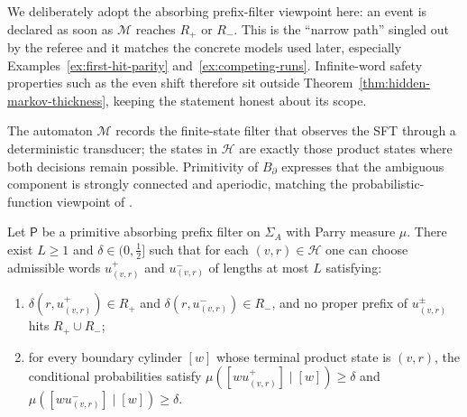 \begin{remark}
We deliberately adopt the absorbing prefix-filter viewpoint here: an event is
declared as soon as $\mathcal{M}$ reaches $R_+$ or $R_-$.  This is the
``narrow path'' singled out by the referee and it matches the concrete models
used later, especially Examples~\ref{ex:first-hit-parity}
and~\ref{ex:competing-runs}.  Infinite-word safety properties such as the even
shift therefore sit outside Theorem~\ref{thm:hidden-markov-thickness}, keeping
the statement honest about its scope.
\end{remark}

The automaton $\mathcal{M}$ records the finite-state filter that observes the
SFT through a deterministic transducer; the states in $\mathcal{H}$ are exactly
those product states where both decisions remain possible.  Primitivity of
$B_\partial$ expresses that the ambiguous component is strongly connected and
aperiodic, matching the probabilistic-function viewpoint of
\cite{Blackwell1957,Heller1965,BaumPetrie1966,BoylePetersenHMP,Verbitskiy2011}.

\begin{lemma}
\label{lem:uniform-windows}
Let $\mathsf{P}$ be a primitive absorbing prefix filter on $\Sigma_A$ with Parry
measure $\mu$.  There exist $L\ge 1$ and $\delta\in(0,\frac12]$ such that for
each $(v,r)\in\mathcal{H}$ one can choose admissible words
$u_{(v,r)}^+$ and $u_{(v,r)}^-$ of lengths at most $L$ satisfying:
\begin{enumerate}[label=(\alph*)]
\item $\delta(r,u_{(v,r)}^+)\in R_+$ and $\delta(r,u_{(v,r)}^-)\in R_-$, and no
  proper prefix of $u_{(v,r)}^\pm$ hits $R_+\cup R_-$;
\item for every boundary cylinder $[w]$ whose terminal product state is
  $(v,r)$, the conditional probabilities satisfy
  $\mu([wu_{(v,r)}^+]\mid[w])\ge\delta$ and
  $\mu([wu_{(v,r)}^-]\mid[w])\ge\delta$.
\end{enumerate}
\end{lemma}

